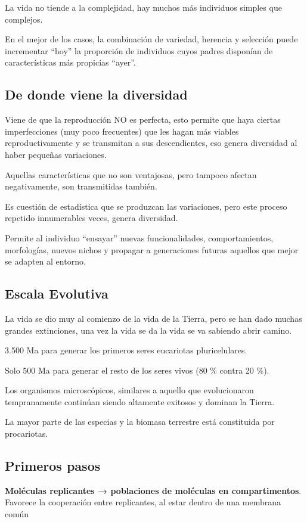 \documentclass[12pt, twoside, openright]{report} %
\begin{document}
La vida no tiende a la complejidad, hay muchos más individuos simples que complejos.

En el mejor de los casos, la combinación de variedad, herencia y selección puede incrementar “hoy” la proporción de individuos cuyos padres disponían de características más propicias “ayer”.

\subsection{De donde viene la diversidad}
Viene de que la reproducción NO es perfecta, esto permite que haya ciertas imperfecciones (muy poco frecuentes) que les hagan más viables reproductivamente y se transmitan a sus descendientes, eso genera diversidad al haber pequeñas variaciones.

Aquellas características que no son ventajosas, pero tampoco afectan negativamente, son transmitidas también.

Es cuestión de estadística que se produzcan las variaciones, pero este proceso repetido innumerables veces, genera diversidad.

Permite al individuo “ensayar” nuevas funcionalidades, comportamientos, morfologías, nuevos nichos y propagar a generaciones futuras aquellos que mejor se adapten al entorno.

\subsection{Escala Evolutiva}
La vida se dio muy al comienzo de la vida de la Tierra, pero se han dado muchas grandes extinciones, una vez la vida se da la vida se va sabiendo abrir camino.

3.500 Ma para generar los primeros seres eucariotas pluricelulares.

Solo 500 Ma para generar el resto de los seres vivos (80 \% contra 20 \%).

Los organismos microscópicos, similares a aquello que evolucionaron tempranamente continúan siendo altamente exitosos y dominan la Tierra.

La mayor parte de las especias y la biomasa terrestre está constituida por procariotas.

\subsection{Primeros pasos}
\textbf{Moléculas replicantes → poblaciones de moléculas en compartimentos}. Favorece la cooperación entre replicantes, al estar dentro de una membrana común
\end{document}
